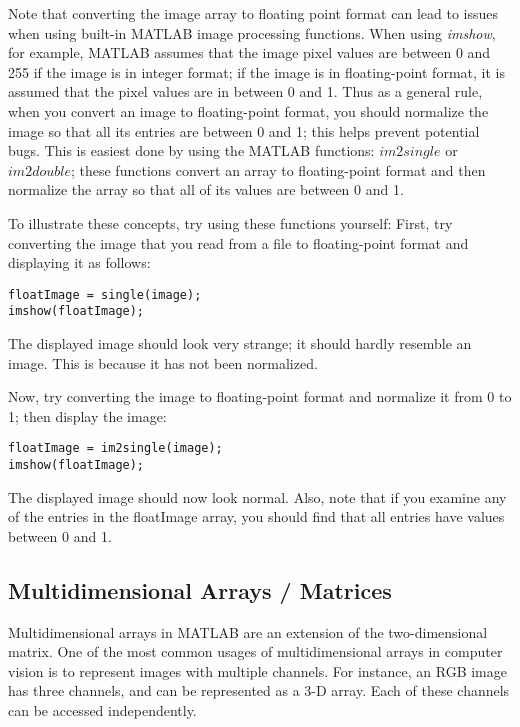 \documentclass{article}
\begin{document}
Note that converting the image array to floating point format can lead to issues when using built-in MATLAB image processing functions. When using \textit{imshow}, for example, MATLAB assumes that the image pixel values are between 0 and 255 if the image is in integer format; if the image is in floating-point format, it is assumed that the pixel values are in between 0 and 1. Thus as a general rule, when you convert an image to floating-point format, you should normalize the image so that all its entries are between 0 and 1; this helps prevent potential bugs. This is easiest done by using the MATLAB functions: \href{https://www.mathworks.com/help/images/ref/im2single.html}{$im2single$} or \href{https://www.mathworks.com/help/images/ref/im2double.html}{$im2double$}; these functions convert an array to floating-point format and then normalize the array so that all of its values are between 0 and 1.

To illustrate these concepts, try using these functions yourself:
First, try converting the image that you read from a file to floating-point format and displaying it as follows:
\begin{lstlisting}[style=Matlab-editor]
floatImage = single(image);
imshow(floatImage);
\end{lstlisting}

The displayed image should look very strange; it should hardly resemble an image. This is because it has not been normalized. 

Now, try converting the image to floating-point format and normalize it from 0 to 1; then display the image:
\begin{lstlisting}[style=Matlab-editor]
floatImage = im2single(image);
imshow(floatImage);
\end{lstlisting}
The displayed image should now look normal. Also, note that if you examine any of the entries in the floatImage array, you should find that all entries have values between 0 and 1.


\subsection{Multidimensional Arrays / Matrices}
Multidimensional arrays in MATLAB are an extension of the two-dimensional matrix. One of the most common usages of multidimensional arrays in computer vision is to represent images with multiple channels. For instance, an RGB image has three channels, and can be represented as a 3-D array. Each of these channels can be accessed independently.
\end{document}
